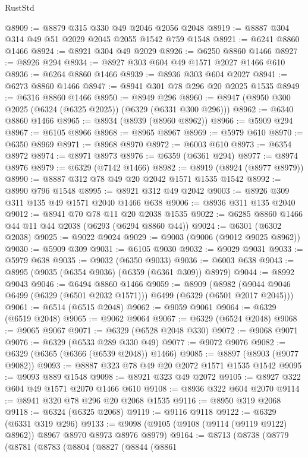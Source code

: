 \begin{lexlean}{RustStd}
\begin{coremodule}
{{@8909 := @8879 @315 @330 @49 @2046 @2056 @2048
@8919 := @8887 @304 @314 @49 @51 @2029 @2045 @2055 @1542 @759 @1548
@8921 := @6241 @8860 @1466
@8924 := @8921 @304 @49 @2029
@8926 := @6250 @8860 @1466
@8927 := @8926 @294
@8934 := @8927 @303 @604 @49 @1571 @2027 @1466 @610
@8936 := @6264 @8860 @1466
@8939 := @8936 @303 @604 @2027
@8941 := @6273 @8860 @1466
@8947 := @8941 @301 @78 @296 @20 @2025 @1535
@8949 := @6316 @8860 @1466
@8950 := @8949 @296
@8960 := @8947 (@8950 @300 @2025 (@6324 (@6325 @2025)) (@6329 (@6331 @300 @296)))
@8962 := @6340 @8860 @1466
@8965 := @8934 (@8939 (@8960 @8962))
@8966 := @5909 @294
@8967 := @6105 @8966
@8968 := @8965 @8967
@8969 := @5979 @610
@8970 := @6350 @8969
@8971 := @8968 @8970
@8972 := @6003 @610
@8973 := @6354 @8972
@8974 := @8971 @8973
@8976 := @6359 (@6361 @294)
@8977 := @8974 @8976
@8979 := @6329 (@7142 @1466)
@8982 := @8919 (@8924 (@8977 @8979))
@8990 := @8887 @312 @78 @49 @20 @2042 @1571 @1535 @1542
@8992 := @8990 @796 @1548
@8995 := @8921 @312 @49 @2042
@9003 := @8926 @309 @311 @135 @49 @1571 @2040 @1466 @638
@9006 := @8936 @311 @135 @2040
@9012 := @8941 @70 @78 @11 @20 @2038 @1535
@9022 := @6285 @8860 @1466 @44 @11 @44 @2038 (@6293 (@6294 @8860 @44))
@9024 := @6301 (@6302 @2038)
@9025 := @9022 @9024
@9029 := @9003 (@9006 (@9012 @9025 @8962))
@9030 := @5909 @309
@9031 := @6105 @9030
@9032 := @9029 @9031
@9033 := @5979 @638
@9035 := @9032 (@6350 @9033)
@9036 := @6003 @638
@9043 := @8995 (@9035 (@6354 @9036) (@6359 (@6361 @309)) @8979)
@9044 := @8992 @9043
@9046 := @6494 @8860 @1466
@9059 := @8909
    (@8982 (@9044 @9046 @6499 (@6329 (@6501 @2032 @1571))) @6499 (@6329 (@6501 @2017 @2045)))
@9061 := @6514 (@6515 @2048)
@9062 := @9059 @9061
@9064 := @6329 (@6519 @2048)
@9065 := @9062 @9064
@9067 := @6329 (@6524 @2048)
@9068 := @9065 @9067
@9071 := @6329 (@6528 @2048 @330)
@9072 := @9068 @9071
@9076 := @6329 (@6533 @289 @330 @49)
@9077 := @9072 @9076
@9082 := @6329 (@6365 (@6366 (@6539 @2048)) @1466)
@9085 := @8897 (@8903 (@9077 @9082))
@9093 := @8887 @323 @78 @49 @20 @2072 @1571 @1535 @1542
@9095 := @9093 @889 @1548
@9098 := @8921 @323 @49 @2072
@9105 := @8927 @322 @604 @49 @1571 @2070 @1466 @610
@9108 := @8936 @322 @604 @2070
@9114 := @8941 @320 @78 @296 @20 @2068 @1535
@9116 := @8950 @319 @2068
@9118 := @6324 (@6325 @2068)
@9119 := @9116 @9118
@9122 := @6329 (@6331 @319 @296)
@9133 := @9098 (@9105 (@9108 (@9114 (@9119 @9122) @8962)) @8967 @8970 @8973 @8976 @8979)
@9164 := @8713
    (@8738
      (@8779
        (@8781
          (@8783
            (@8804
              (@8827
                (@8844
                  (@8861
}}
\end{coremodule}
\end{lexlean}

